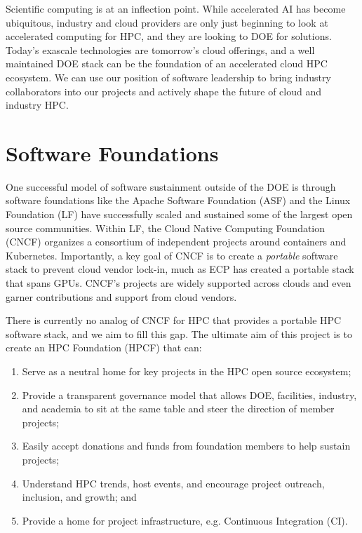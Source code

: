 \documentclass[11pt]{article}
\begin{document}
Scientific computing is at an inflection point. While
accelerated AI has become ubiquitous, industry and cloud providers are only just
beginning to look at accelerated computing for HPC, and they are looking to DOE for
solutions. Today's exascale technologies are tomorrow's cloud offerings, and a well
maintained DOE stack can be the foundation of an accelerated cloud HPC ecosystem. We can
use our position of software leadership to bring industry collaborators into our
projects and actively shape the future of cloud and industry HPC.

\section{Software Foundations}

One successful model of software sustainment outside of the DOE is through
software foundations like the Apache Software Foundation (ASF) and the Linux Foundation
(LF) have successfully scaled and sustained some of the largest open source communities.
Within LF, the Cloud Native Computing Foundation (CNCF) organizes a consortium of
independent projects around containers and Kubernetes. Importantly, a key goal of CNCF
is to create a {\it portable} software stack to prevent cloud vendor lock-in, much as
ECP has created a portable stack that spans GPUs. CNCF's projects are widely supported
across clouds and even garner contributions and support from cloud vendors.

There is currently no analog of CNCF for HPC that provides a portable HPC software
stack, and we aim to fill this gap. The ultimate aim of this project is to create an HPC
Foundation (HPCF) that can:
\begin{enumerate}
\item Serve as a neutral home for key projects in the HPC open source ecosystem;
\item Provide a transparent governance model that allows DOE, facilities, industry, and
  academia to sit at the same table and steer the direction of member projects;
\item Easily accept donations and funds from foundation members to help sustain projects;
\item Understand HPC trends, host events, and encourage project outreach, inclusion, and
  growth; and
\item Provide a home for project infrastructure, e.g. Continuous Integration (CI).
\end{enumerate}
\end{document}
